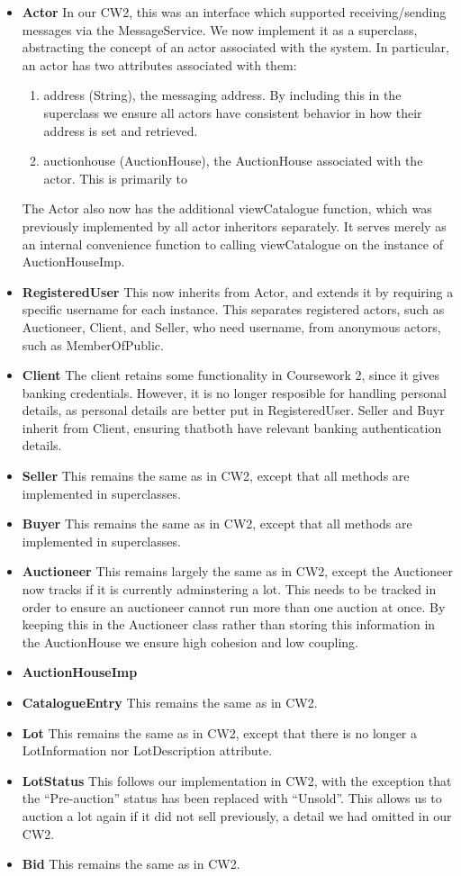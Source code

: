 \documentclass[titlepage, 12pt]{extarticle}
\begin{document}
\begin{itemize}
    \item {\bf Actor} In our CW2, this was an interface which supported receiving/sending messages via the MessageService. We now implement it as a superclass, abstracting the concept of an actor associated with the system. In particular, an actor has two attributes associated with them:
  \begin{enumerate}
    \item address (String), the messaging address. By including this in the superclass we ensure all actors have consistent behavior in how their address is set and retrieved.
    \item auctionhouse (AuctionHouse), the AuctionHouse associated with the actor. This is primarily to 
  \end{enumerate}
  The Actor also now has the additional viewCatalogue function, which was previously implemented by all actor inheritors separately. It serves merely as an internal convenience function to calling viewCatalogue on the instance of AuctionHouseImp.
\item {\bf RegisteredUser} This now inherits from Actor, and extends it by requiring a specific username for each instance. This separates registered actors, such as Auctioneer, Client, and Seller, who need username, from anonymous actors, such as MemberOfPublic.
\item {\bf Client} The client retains some functionality in Coursework 2, since it gives banking credentials. However, it is no longer resposible for handling personal details, as personal details are better put in RegisteredUser. Seller and Buyr inherit from Client, ensuring thatboth have relevant banking authentication details.
\item {\bf Seller} This remains the same as in CW2, except that all methods are implemented in superclasses.
\item {\bf Buyer} This remains the same as in CW2, except that all methods are implemented in superclasses. 
\item {\bf Auctioneer} This remains largely the same as in CW2, except the Auctioneer now tracks if it is currently adminstering a lot. This needs to be tracked in order to ensure an auctioneer cannot run more than one auction at once. By keeping this in the Auctioneer class rather than storing this information in the AuctionHouse we ensure high cohesion and low coupling.
\item {\bf AuctionHouseImp} 
\item {\bf CatalogueEntry} This remains the same as in CW2.
\item {\bf Lot} This remains the same as in CW2, except that there is no longer a LotInformation nor LotDescription attribute. 
\item {\bf LotStatus} This follows our implementation in CW2, with the exception that the ``Pre-auction'' status has been replaced with ``Unsold''. This allows us to auction a lot again if it did not sell previously, a detail we had omitted in our CW2. 
\item {\bf Bid} This remains the same as in CW2.
\end{itemize}
\end{document}
